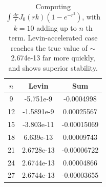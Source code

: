 \documentclass[a4,12pt]{article}
\begin{document}
\begin{table}
	\begin{center}
		\begin{tabular}{|c||c|c|}
			\hline
			$n$&Levin&Sum\\\hline
			9&	-5.751e-9&	-0.0004998\\\hline
			12&	-1.5891e-9&	0.00025567\\\hline
			15&	-3.803e-11&	-0.00015069\\\hline
			18&	6.639e-13&	0.00009743\\\hline
			21&	2.6728e-13&	-0.00006722\\\hline
			24&	2.6744e-13&	0.00004866\\\hline
			27&	2.6744e-13&	-0.00003655\\\hline
		\end{tabular}
	\end{center}
	\caption{
		Computing $\int \frac{dr}{r}J_0(r k)(1-e^{-r^2})$, with $k=10$ adding up to $n$ th term.
		Levin-accelerated case reaches the true value of $\sim$2.674e-13 far more quickly, and shows superior stability.
	}
	\label{tab:levin}
\end{table}
\printbibliography
\end{document}
